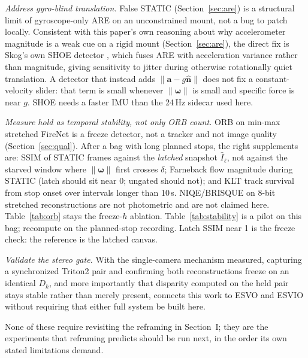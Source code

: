 \documentclass[journal]{IEEEtran}
\DeclareRobustCommand{\norm}[1]{\lVert #1 \rVert}
\begin{document}
\textit{Address gyro-blind translation.} False STATIC (Section~\ref{sec:are}) is
a structural limit of gyroscope-only ARE on an unconstrained mount, not a bug to
patch locally. Consistent with this paper's own reasoning about why
accelerometer magnitude is a weak cue on a rigid mount (Section~\ref{sec:are}),
the direct fix is Skog's own SHOE detector \cite{skog2010tbe}, which fuses ARE
with acceleration variance rather than magnitude, giving sensitivity to jitter
during otherwise rotationally quiet translation. A detector that instead adds
\(\norm{\mathbf{a}-g\hat{\mathbf{n}}}\) does not fix a constant-velocity slider:
that term is small whenever \(\norm{\boldsymbol{\omega}}\) is small and specific force
is near \(g\). SHOE needs a faster IMU than the 24\,Hz sidecar used here.

\textit{Measure hold as temporal stability, not only ORB count.} ORB on min-max
stretched FireNet is a freeze detector, not a tracker and not image quality
(Section~\ref{sec:qual}). After a bag with long planned stops, the right
supplements are: SSIM of STATIC frames against the \emph{latched} snapshot
\(\hat{I}_{\ell}\), not against the starved window where \(\norm{\boldsymbol{\omega}}\)
first crosses \(\delta\); Farneback flow magnitude during STATIC (latch should
sit near 0; ungated should not); and KLT track survival from stop onset over
intervals longer than 10\,s. NIQE/BRISQUE on 8-bit stretched reconstructions
are not photometric and are not claimed here. Table~\ref{tab:orb} stays the
freeze-\(h\) ablation. Table~\ref{tab:stability} is a pilot on this bag;
recompute on the planned-stop recording. Latch SSIM near 1 is the freeze
check: the reference is the latched canvas.

\textit{Validate the stereo gate.} With the single-camera mechanism measured,
capturing a synchronized Triton2 pair and confirming both reconstructions freeze
on an identical \(D_k\), and more importantly that disparity computed on the
held pair stays stable rather than merely present, connects this work to ESVO
\cite{zhou2021} and ESVIO \cite{chen2023} without requiring that either full
system be built here.

None of these require revisiting the reframing in Section~I; they are the
experiments that reframing predicts should be run next, in the order its own
stated limitations demand.
\end{document}
